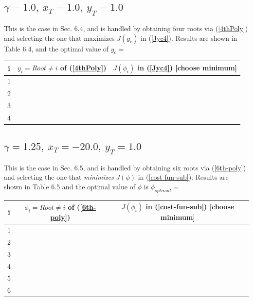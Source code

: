 \subsection{$\gamma=1.0,\ x_T=1.0,\ y_T=1.0$}
This is the case in Sec. 6.4, and is handled by obtaining four roots via (\ref{4thPoly}) and selecting the one that maximizes $J(y_c)$ in (\ref{Jyc4}). Results are shown in Table 6.4, and the optimal value of $y_c=$

\begin{center}
\begin{tabular}{ |c||c|c| } 
\hline
i & $y_i = Root\neq i$ of (\ref{4thPoly}) & $J(\phi_i)$ in (\ref{Jyc4}) [choose minimum]  \\
 \hline
 \hline
 1 &  &  \\
 \hline 
 2 &  &  \\
 \hline 
 3 &  &  \\ 
 \hline
 4 &  &  \\ 
  \hline
\end{tabular}
\end{center}



\subsection{$\gamma=1.25,\ x_T=-20.0,\ y_T=1.0$}
This is the case in Sec. 6.5, and is handled by obtaining six roots via (\ref{6th-poly}) and selecting the one that \textit{minimizes} $J(\phi)$ in (\ref{cost-fun-sub}). Results are shown in Table 6.5 and the optimal value of $\phi$ is $\phi_{optimal}=$


\begin{center}
\begin{tabular}{ |c||c|c| } 
\hline
i & $\phi_i = Root\neq i$ of (\ref{6th-poly}) & $J(\phi_i)$ in (\ref{cost-fun-sub}) [choose minimum]  \\
 \hline
 \hline
 1 &  &  \\
 \hline 
 2 &  &  \\
 \hline 
 3 &  &  \\ 
 \hline
 4 &  &  \\
  \hline
  5&  &  \\ 
   \hline
   6 &  &  \\  
  \hline
\end{tabular}
\end{center}




